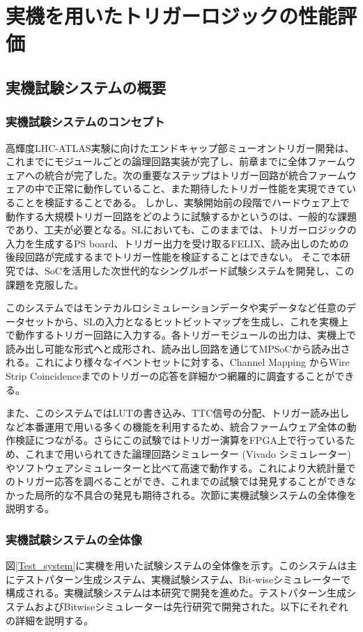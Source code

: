 \chapter{実機を用いたトリガーロジックの性能評価}
\label{chap_TriggerTest}

\section{実機試験システムの概要}
\subsection{実機試験システムのコンセプト}
高輝度LHC-ATLAS実験に向けたエンドキャップ部ミューオントリガー開発は、これまでにモジュールごとの論理回路実装が完了し、前章までに全体ファームウェアへの統合が完了した。次の重要なステップはトリガー回路が統合ファームウェアの中で正常に動作していること、また期待したトリガー性能を実現できていることを検証することである。
しかし、実験開始前の段階でハードウェア上で動作する大規模トリガー回路をどのように試験するかというのは、一般的な課題であり、工夫が必要となる。SLにおいても、このままでは、トリガーロジックの入力を生成するPS board、トリガー出力を受け取るFELIX、読み出しのための後段回路が完成するまでトリガー性能を検証することはできない。
そこで本研究では、SoCを活用した次世代的なシングルボード試験システムを開発し、この課題を克服した。

このシステムではモンテカルロシミュレーションデータや実データなど任意のデータセットから、SLの入力となるヒットビットマップを生成し、これを実機上で動作するトリガー回路に入力する。各トリガーモジュールの出力は、実機上で読み出し可能な形式へと成形され、読み出し回路を通じてMPSoCから読み出される。これにより様々なイベントセットに対する、Channel Mapping からWire Strip Coincidenceまでのトリガーの応答を詳細かつ網羅的に調査することができる。

また、このシステムではLUTの書き込み、TTC信号の分配、トリガー読み出しなど本番運用で用いる多くの機能を利用するため、統合ファームウェア全体の動作検証につながる。さらにこの試験ではトリガー演算をFPGA上で行っているため、これまで用いられてきた論理回路シミュレーター (Vivado シミュレーター) やソフトウェアシミュレーターと比べて高速で動作する。これにより大統計量でのトリガー応答を調べることができ、これまでの試験では発見することができなかった局所的な不具合の発見も期待される。次節に実機試験システムの全体像を説明する。

\subsection{実機試験システムの全体像}
\label{subsec_TestSystemOverview}
図\ref{Test_system}に実機を用いた試験システムの全体像を示す。このシステムは主にテストパターン生成システム、実機試験システム、Bit-wiseシミュレーターで構成される。実機試験システムは本研究で開発を進めた。テストパターン生成システムおよびBitwiseシミュレーターは先行研究で開発された。以下にそれぞれの詳細を説明する。

